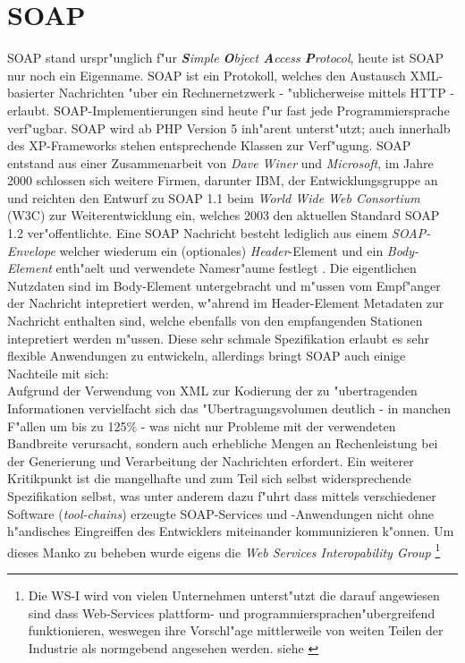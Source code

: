 \section{SOAP}
\label{sec:background:soap}
SOAP stand urspr"unglich f"ur \emph{\textbf{S}imple \textbf{O}bject \textbf{A}ccess \textbf{P}rotocol},
heute ist SOAP nur noch ein Eigenname.
SOAP ist ein Protokoll, welches den Austausch XML-basierter Nachrichten "uber ein Rechnernetzwerk - "ublicherweise
mittels HTTP - erlaubt. SOAP-Implementierungen sind heute f"ur fast jede Programmiersprache verf"ugbar. SOAP wird
ab PHP Version 5 inh"arent unterst"utzt; auch innerhalb des XP-Frameworks stehen entsprechende Klassen zur Verf"ugung.
SOAP entstand aus einer Zusammenarbeit von \emph{Dave Winer} und \emph{Microsoft}, im Jahre 2000 schlossen sich 
weitere Firmen, darunter IBM, der Entwicklungsgruppe an und reichten den Entwurf zu SOAP 1.1 beim 
\emph{World Wide Web Consortium} (W3C) zur Weiterentwicklung ein, welches 2003 den aktuellen Standard SOAP 1.2
ver"offentlichte.
Eine SOAP Nachricht besteht lediglich aus einem \emph{SOAP-Envelope} welcher wiederum ein (optionales) \emph{Header}-Element
und ein \emph{Body-Element} enth"aelt und verwendete Namesr"aume festlegt \cite{SOAPSPEC}. Die eigentlichen Nutzdaten sind
im Body-Element untergebracht und m"ussen vom Empf"anger der Nachricht intepretiert werden, w"ahrend im Header-Element Metadaten
zur Nachricht enthalten sind, welche ebenfalls von den empfangenden Stationen intepretiert werden m"ussen. Diese sehr schmale
Spezifikation erlaubt es sehr flexible Anwendungen zu entwickeln, allerdings bringt SOAP auch einige Nachteile mit sich:\\
Aufgrund der Verwendung von XML zur Kodierung der zu "ubertragenden Informationen vervielfacht sich das "Ubertragungsvolumen
deutlich - in manchen F"allen um bis zu 125\% - was nicht nur Probleme mit der verwendeten Bandbreite verursacht, sondern auch
erhebliche Mengen an Rechenleistung bei der Generierung und Verarbeitung der Nachrichten erfordert. Ein weiterer Kritikpunkt ist
die mangelhafte und zum Teil sich selbst widersprechende Spezifikation selbst, was unter anderem dazu f"uhrt dass mittels verschiedener
Software (\emph{tool-chains}) erzeugte SOAP-Services und -Anwendungen nicht ohne h"andisches Eingreiffen des Entwicklers miteinander kommunizieren 
k"onnen. Um dieses Manko zu beheben wurde eigens die \emph{Web Services Interopability Group} \footnote{
Die WS-I wird von vielen Unternehmen unterst"utzt die darauf angewiesen sind dass Web-Services plattform- und programmiersprachen"ubergreifend
funktionieren, weswegen ihre Vorschl"age mittlerweile von weiten Teilen der Industrie als normgebend angesehen werden.
siehe \cite{WSIHP}
}

